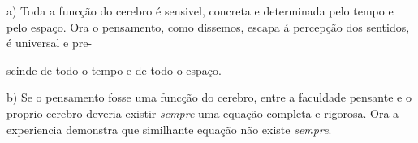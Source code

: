 




 

a) Toda a funcção do cerebro é sensivel, concreta e determinada pelo tempo e pelo espaço. Ora o pensamento, como dissemos, escapa á percepção dos sentidos, é universal e pre-

scinde de todo o tempo e de todo o espaço.

b) Se o pensamento fosse uma funcção do cerebro, entre a faculdade pensante e o proprio cerebro deveria existir \emph{sempre} uma equação completa e rigorosa. Ora a experiencia demonstra que similhante equação não existe \emph{sempre}.

